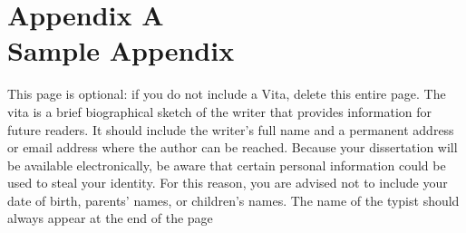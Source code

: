 \documentclass[12pt]{report}         %
\begin{document}
\chapter*{Appendix A\\Sample Appendix}
\label{chap:appendix}

 
\printglossaries
{} 



                    



\begin{thesisauthorvita}    

This page is optional:  if you do not include a Vita, delete this entire page.  The vita is a brief biographical sketch of the writer that provides information for future readers.  It should include the writer's full name and a permanent address or email address where the author can be reached. Because your dissertation will be available electronically, be aware that certain personal information could be used to steal your identity. For this reason, you are advised not to include your date of birth, parents’ names, or children’s names. The name of the typist should always appear at the end of the page

\end{thesisauthorvita}               
\end{document}
